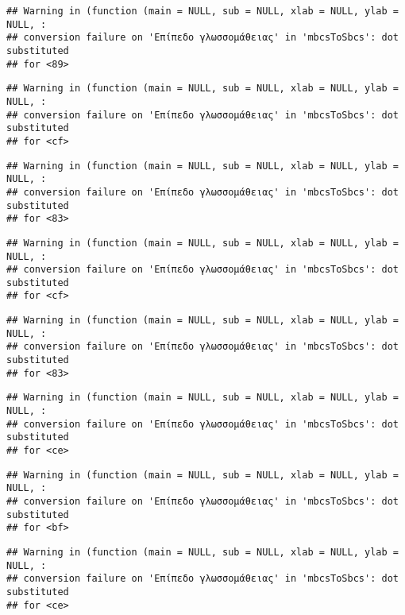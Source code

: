 \documentclass[
]{article}
\begin{document}
\begin{verbatim}
## Warning in (function (main = NULL, sub = NULL, xlab = NULL, ylab = NULL, :
## conversion failure on 'Επίπεδο γλωσσομάθειας' in 'mbcsToSbcs': dot substituted
## for <89>
\end{verbatim}

\begin{verbatim}
## Warning in (function (main = NULL, sub = NULL, xlab = NULL, ylab = NULL, :
## conversion failure on 'Επίπεδο γλωσσομάθειας' in 'mbcsToSbcs': dot substituted
## for <cf>
\end{verbatim}

\begin{verbatim}
## Warning in (function (main = NULL, sub = NULL, xlab = NULL, ylab = NULL, :
## conversion failure on 'Επίπεδο γλωσσομάθειας' in 'mbcsToSbcs': dot substituted
## for <83>
\end{verbatim}

\begin{verbatim}
## Warning in (function (main = NULL, sub = NULL, xlab = NULL, ylab = NULL, :
## conversion failure on 'Επίπεδο γλωσσομάθειας' in 'mbcsToSbcs': dot substituted
## for <cf>
\end{verbatim}

\begin{verbatim}
## Warning in (function (main = NULL, sub = NULL, xlab = NULL, ylab = NULL, :
## conversion failure on 'Επίπεδο γλωσσομάθειας' in 'mbcsToSbcs': dot substituted
## for <83>
\end{verbatim}

\begin{verbatim}
## Warning in (function (main = NULL, sub = NULL, xlab = NULL, ylab = NULL, :
## conversion failure on 'Επίπεδο γλωσσομάθειας' in 'mbcsToSbcs': dot substituted
## for <ce>
\end{verbatim}

\begin{verbatim}
## Warning in (function (main = NULL, sub = NULL, xlab = NULL, ylab = NULL, :
## conversion failure on 'Επίπεδο γλωσσομάθειας' in 'mbcsToSbcs': dot substituted
## for <bf>
\end{verbatim}

\begin{verbatim}
## Warning in (function (main = NULL, sub = NULL, xlab = NULL, ylab = NULL, :
## conversion failure on 'Επίπεδο γλωσσομάθειας' in 'mbcsToSbcs': dot substituted
## for <ce>
\end{verbatim}
\end{document}
